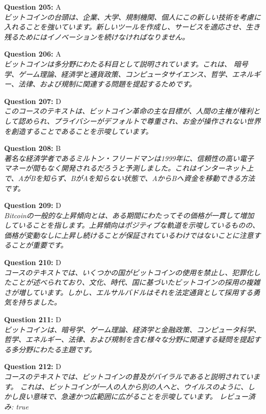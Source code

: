 \documentclass[12pt,a4paper]{article}
\begin{document}
\begin{enumerate}
{{{{{{{{{\item \textbf{Question 205:} A
\\ \textit{ビットコインの台頭は、企業、大学、規制機関、個人にこの新しい技術を考慮に入れることを強いています。新しいツールを作成し、サービスを適応させ、生き残るためにはイノベーションを続けなければなりません。}

\item \textbf{Question 206:} A
\\ \textit{ビットコインは多分野にわたる科目として説明されています。これは、
暗号学、ゲーム理論、経済学と通貨政策、コンピュータサイエンス、哲学、エネルギー、法律、および規制に関連する問題を提起するためです。}

\item \textbf{Question 207:} D
\\ \textit{このコースのテキストは、ビットコイン革命の主な目標が、人間の主権が権利として認められ、プライバシーがデフォルトで尊重され、お金が操作されない世界を創造することであることを示唆しています。}

\item \textbf{Question 208:} B
\\ \textit{著名な経済学者であるミルトン・フリードマンは1999年に、信頼性の高い電子マネーが間もなく開発されるだろうと予測しました。これはインターネット上で、AがBを知らず、BがAを知らない状態で、AからBへ資金を移動できる方法です。}

\item \textbf{Question 209:} D
\\ \textit{Bitcoinの一般的な上昇傾向とは、ある期間にわたってその価格が一貫して増加していることを指します。上昇傾向はポジティブな軌道を示唆しているものの、価格が変動なしに上昇し続けることが保証されているわけではないことに注意することが重要です。}

\item \textbf{Question 210:} D
\\ \textit{コースのテキストでは、いくつかの国がビットコインの使用を禁止し、犯罪化したことが述べられており、文化、時代、国に基づいたビットコインの採用の複雑さが増しています。しかし、エルサルバドルはそれを法定通貨として採用する勇気を持ちました。}

\item \textbf{Question 211:} D
\\ \textit{ビットコインは、暗号学、ゲーム理論、経済学と金融政策、コンピュータ科学、哲学、エネルギー、法律、および規制を含む様々な分野に関連する疑問を提起する多分野にわたる主題です。}

\item \textbf{Question 212:} D
\\ \textit{コースのテキストでは、ビットコインの普及がバイラルであると説明されています。
これは、ビットコインが一人の人から別の人へと、ウイルスのように、しかし良い意味で、急速かつ広範囲に広がることを示唆しています。
レビュー済み: true}

}}}}}}}}}
\end{enumerate}
\end{document}
